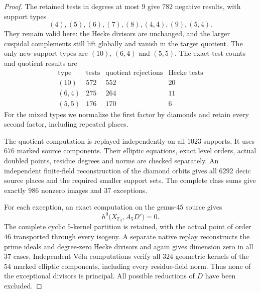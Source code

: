 \begin{proof}
The retained tests in degrees at most $9$ give $782$ negative results,
with support types
\[
 (4),(5),(6),(7),(8),(4,4),(9),(5,4).
\]
They remain valid here: the Hecke divisors are unchanged, and the larger
cuspidal complements still lift globally and vanish in the target quotient.
The only new support types are $(10)$, $(6,4)$ and $(5,5)$.
The exact test counts and quotient results are
\[
\begin{array}{c|r|r|r}
\text{type}&\text{tests}&\text{quotient rejections}&\text{Hecke tests}\\\hline
(10)&572&552&20\\
(6,4)&275&264&11\\
(5,5)&176&170&6
\end{array}
\]
For the mixed types we normalize the first factor by diamonds and retain
every second factor, including repeated places.

The quotient computation is replayed independently on all $1023$ supports.
It uses $676$ marked source components.
Their elliptic equations, exact level orders, actual doubled points,
residue degrees and norms are checked separately.
An independent finite-field reconstruction of the diamond orbits gives
all $6292$ decic source places and the required smaller support sets.
The complete class sums give exactly $986$ nonzero images and $37$ exceptions.

For each exception, an exact computation on the genus-$45$ source gives
\[
 h^0\bigl(X_{\mathbb F_3},A_5D'\bigr)=0.
\]
The complete cyclic $5$-kernel partition is retained, with the actual
point of order $46$ transported through every isogeny.
A separate native replay reconstructs the prime ideals and degree-zero
Hecke divisors and again gives dimension zero in all $37$ cases.
Independent V\'elu computations verify all $324$ geometric kernels of
the $54$ marked elliptic components, including every residue-field norm.
Thus none of the exceptional divisors is principal.
All possible reductions of $D$ have been excluded.
\end{proof}
